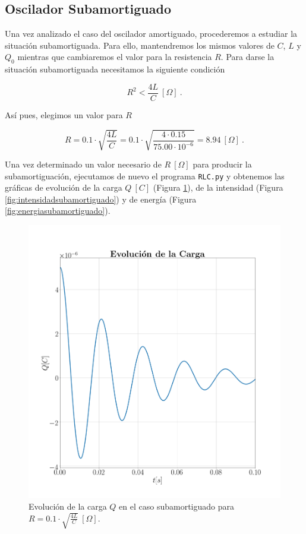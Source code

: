 \documentclass[journal]{IEEEtran}
\begin{document}
\clearpage

\subsection{Oscilador Subamortiguado}
\label{subsec:osciladorsubamortiguado}

Una vez analizado el caso del oscilador amortiguado, procederemos a estudiar la situación subamortiguada. Para ello, mantendremos los mismos valores de $C$, $L$ y $Q_0$ mientras que cambiaremos el valor para la resistencia $R$. Para darse la situación subamortiguada necesitamos la siguiente condición

\begin{equation}
R^2 < \frac{4L}{C}~[\Omega]~.
\end{equation}

Así pues, elegimos un valor para $R$

\begin{equation}
R = 0.1 \cdot \sqrt{\frac{4L}{C}} = 0.1\cdot\sqrt{\frac{4\cdot 0.15}{75.00\cdot10^{-6}}} = 8.94~[\Omega]~.
\end{equation}

Una vez determinado un valor necesario de $R~[\Omega]$ para producir la subamortiguación, ejecutamos de nuevo el programa \texttt{RLC.py} y obtenemos las gráficas de evolución de la carga $Q~[C]$ (Figura \ref{fig:cargasubamortiguado}), de la intensidad (Figura \ref{fig:intensidadsubamortiguado}) y de energía (Figura \ref{fig:energiasubamortiguado}).

\begin{figure}[!htb]
    \centering
    \includegraphics[width=\linewidth,trim={70 70 70 70},clip]{cargasubamortiguado.png}
    \caption{Evolución de la carga $Q$ en el caso subamortiguado para $R=0.1 \cdot\sqrt{\frac{4L}{C}}~[\Omega]$.}
    \label{fig:cargasubamortiguado}
\end{figure}
\end{document}
